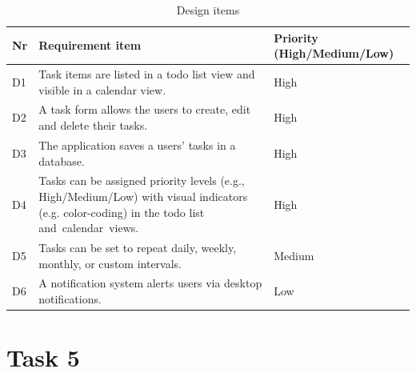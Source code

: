 \documentclass{article}
\begin{document}
\begin{table}[h]
  \centering
  \begin{tabularx}{\textwidth}{l|X|l}
    \toprule
    \textbf{Nr} & \textbf{Requirement item}                                                                                                                     & \textbf{Priority (High/Medium/Low)} \\
    \hline\hline
    D1          & Task items are listed in a todo list view and visible in a calendar view.                                                                     & High                                \\
    \hline
    D2          & A task form allows the users to create, edit and delete their tasks.                                                                          & High                                \\
    \hline
    D3          & The application saves a users' tasks in a database.                                                                                           & High                                \\
    \hline
    D4          & Tasks can be assigned priority levels (e.g., High/Medium/Low) with visual indicators (e.g. color-coding) in the todo list and calendar views. & High                                \\
    \hline
    D5          & Tasks can be set to repeat daily, weekly, monthly, or custom intervals.                                                                       & Medium                              \\
    \hline
    D6          & A notification system alerts users via desktop notifications.                                                                                 & Low                                 \\
    \bottomrule
  \end{tabularx}
  \caption{Design items}
  \label{Design items}
\end{table}

\clearpage

\section{Task 5}
\end{document}
